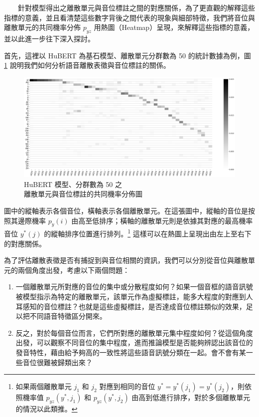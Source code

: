 {

　　針對模型得出之離散單元與音位標註之間的對應關係，為了更直觀的解釋這些指標的意義，並且看清楚這些數字背後之間代表的現象與細部特徵，我們將音位與離散單元的共同機率分佈 \(p_{yz}\) 用熱圖（Heatmap）呈現，來解釋這些指標的意義，並以此進一步往下深入探討。

        首先，這裡以 HuBERT 為基石模型、離散單元分群數為 50 的統計數據為例，圖 \ref{fig:hubert-50-joint-byprob} 說明我們如何分析語音離散表徵與音位標註的關係。
{


\begin{figure}
    \centering
    \includegraphics[width=1\linewidth]{figures/hubert-50-joint-byprob.png}
    \caption{HuBERT 模型、分群數為 50 之 \\
    離散單元與音位標註的共同機率分佈圖}
    \label{fig:hubert-50-joint-byprob}
\end{figure}

}
        圖中的縱軸表示各個音位，橫軸表示各個離散單元。在這張圖中，縱軸的音位是按照其邊際機率 \(p_y(i)\) 由高至低排序；橫軸的離散單元則是依據其對應的最高機率音位 \(y^\ast(j)\) 的縱軸排序位置進行排列。\footnote{如果兩個離散單元 \(j_1\) 和 \(j_2\) 對應到相同的音位 \(y^\ast = y^\ast(j_1) = y^\ast(j_2)\)，則依照機率值 \(p_{yz}(y^\ast, j_1)\) 和 \(p_{yz}(y^\ast, j_2)\) 由高到低進行排序，對於多個離散單元的情況以此類推。} 這樣可以在熱圖上呈現出由左上至右下的對應關係。


        為了評估離散表徵是否有捕捉到與音位相關的資訊，我們可以分別從音位與離散單元的兩個角度出發，考慮以下兩個問題：
\begin{enumerate}
    \item 一個離散單元所對應的音位的集中或分散程度如何？如果一個音框的語音訊號被模型指示為特定的離散單元，該單元作為虛擬標註，能多大程度的對應到人耳感知的音位標註？也就是這些虛擬標註，是否達成音位標註類似的效果，足以把不同語音特徵區分開來。
    \item 反之，對於每個音位而言，它們所對應的離散單元集中程度如何？從這個角度出發，可以觀察不同音位的集中程度，進而推論模型是否能夠辨認出該音位的發音特性，藉由給予夠高的一致性將這些語音訊號分類在一起。會不會有某一些音位很難被歸類出來？
\end{enumerate}

}
